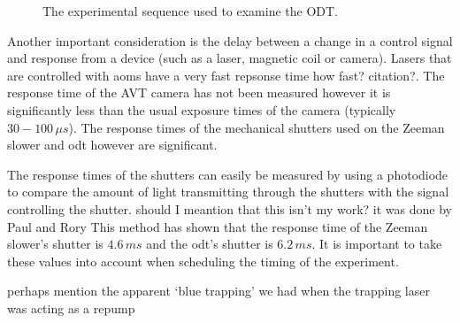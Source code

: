 \begin{figure}[H]
\caption{The experimental sequence used to examine the ODT.}
\label{fig:sequence}
\end{figure}

Another important consideration is the delay between a change in a control signal and response from a device (such as a laser, magnetic coil or camera). Lasers that are controlled with \glspl{aom} have a very fast repsonse time {\color{red} how fast? citation?}. The response time of the AVT camera has not been measured however it is significantly less than the usual exposure times of the camera (typically $30-100\,\unit{\mu s}$). The response times of the mechanical shutters used on the Zeeman slower and \gls{odt} however are significant.

The response times of the shutters can easily be measured by using a photodiode to compare the amount of light transmitting through the shutters with the signal controlling the shutter. {\color{red} should I meantion that this isn't my work? it was done by Paul and Rory} This method has shown that the response time of the Zeeman slower's shutter is $4.6\,\unit{ms}$ and the \gls{odt}'s shutter is $6.2\,\unit{ms}$. It is important to take these values into account when scheduling the timing of the experiment.

{\color{red} perhaps mention the apparent `blue trapping' we had when the trapping laser was acting as a repump}
